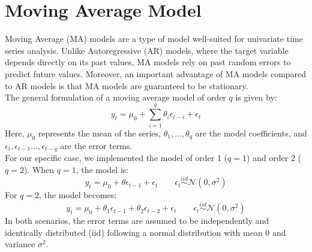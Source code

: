 \chapter{Moving Average Model}
\label{MA}
Moving Average (MA) models are a type of model well-suited for univariate time series analysis. Unlike Autoregressive (AR) models, where the target variable depends directly on its past values, MA models rely on past random errors to predict future values.
Moreover, an important advantage of MA models compared to AR models is that MA models are guaranteed to be stationary. \\
The general formulation of a moving average model of order $q$ is given by:
\begin{equation}
    y_{t} = \mu_0 + \sum_{i=1}^{q} \theta_i \epsilon_{t-i} + \epsilon_{t}
\end{equation}
Here, $\mu_0$ represents the mean of the series, $\theta_1, ... , \theta_q$ are the model coefficients, and $\epsilon_t, \epsilon_{t-1}... , \epsilon_{t-q}$ are the error terms. \\
For our specific case, we implemented the model of order 1 ($q=1$) and order 2 ($q=2$). When $q=1$, the model is:
\begin{equation}
    \label{MA_q1}
    y_{t}=\mu_{0}+\theta \epsilon_{t-1} +\epsilon_t \qquad 
    \epsilon_t \stackrel{iid}{\sim} \mathcal{N}(0,\sigma^2)
\end{equation}
For $q=2$, the model becomes:
\begin{equation}
    \label{MA_q2}
    y_{t}=\mu_{0}+\theta_1 \epsilon_{t-1}+\theta_2 \epsilon_{t-2}+\epsilon_t   \qquad 
    \epsilon_t \stackrel{iid}{\sim} \mathcal{N}(0,\sigma^2)
\end{equation}
In both scenarios, the error terms are assumed to be independently and identically distributed (iid) following a normal distribution with mean 0 and variance $\sigma^2$.


